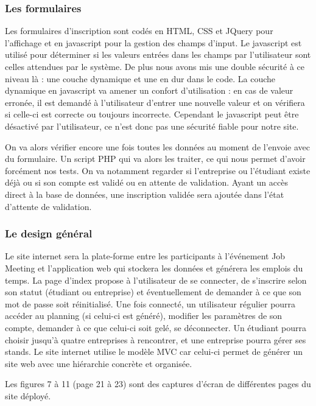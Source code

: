 \documentclass[12pt,a4paper]{article}
\begin{document}
\subsubsection*{Les formulaires}

\begin{large}
\begin{onehalfspace}Les formulaires d’inscription sont codés en HTML, CSS et JQuery pour l’affichage et en javascript pour la gestion des champs d’input. Le javascript est utilisé pour déterminer si les valeurs entrées dans les champs par l’utilisateur sont celles attendues par le système. De plus nous avons mis une double sécurité à ce niveau là : une couche dynamique et une en dur dans le code. La couche dynamique en javascript va amener un confort d’utilisation : en cas de valeur erronée, il est demandé à l’utilisateur d’entrer une nouvelle valeur et on vérifiera si celle-ci est correcte ou toujours incorrecte. Cependant le javascript peut être désactivé par l’utilisateur, ce n’est donc pas une sécurité fiable pour notre site.

	On va alors vérifier encore une fois toutes les données au moment de l’envoie avec du formulaire. Un script PHP qui va alors les traiter, ce qui nous permet d’avoir forcément nos tests. On va notamment regarder si l’entreprise ou l’étudiant existe déjà ou si son compte est validé ou en attente de validation. Ayant un accès direct à la base de données, une inscription validée sera ajoutée dans l’état d’attente de validation.
\end{onehalfspace}
\end{large}

\subsubsection*{Le design général}

\begin{large}
\begin{onehalfspace}Le site internet sera la plate-forme entre les participants à l’événement Job Meeting et l’application web qui stockera les données et générera les emplois du temps. La page d’index propose à l’utilisateur de se connecter, de s’inscrire selon son statut (étudiant ou entreprise) et éventuellement de demander à ce que son mot de passe soit réinitialisé. Une fois connecté, un utilisateur régulier pourra accéder au planning (si celui-ci est généré), modifier les paramètres de son compte, demander à ce que celui-ci soit gelé, se déconnecter. Un étudiant pourra choisir jusqu’à quatre entreprises à rencontrer, et une entreprise pourra gérer ses stands. Le site internet utilise le modèle MVC car celui-ci permet de générer un site web avec une hiérarchie concrète et organisée.

    Les figures 7 à 11 (page 21 à 23) sont des captures d’écran de différentes pages du site déployé.
\end{onehalfspace}
\end{large}
\end{document}
